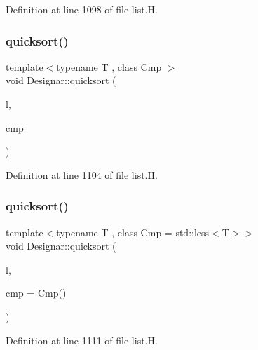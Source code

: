 Definition at line 1098 of file list.\+H.

\mbox{\label{namespace_designar_abdb3fae2c35a0696dfb66711eb224f5a}} 
\subsubsection{\texorpdfstring{quicksort()}{quicksort()}\hspace{0.1cm}{\footnotesize\ttfamily [8/14]}}
{\footnotesize\ttfamily template$<$typename T , class Cmp $>$ \\
void Designar\+::quicksort (\begin{DoxyParamCaption}\item[{\hyperlink{class_designar_1_1_d_l_list}{D\+L\+List}$<$ T $>$ \&}]{l,  }\item[{Cmp \&}]{cmp }\end{DoxyParamCaption})\hspace{0.3cm}{\ttfamily [inline]}}



Definition at line 1104 of file list.\+H.

\mbox{\label{namespace_designar_a199363a09da37dd34fdf7d151441fa44}} 
\subsubsection{\texorpdfstring{quicksort()}{quicksort()}\hspace{0.1cm}{\footnotesize\ttfamily [9/14]}}
{\footnotesize\ttfamily template$<$typename T , class Cmp  = std\+::less$<$\+T$>$$>$ \\
void Designar\+::quicksort (\begin{DoxyParamCaption}\item[{\hyperlink{class_designar_1_1_d_l_list}{D\+L\+List}$<$ T $>$ \&}]{l,  }\item[{Cmp \&\&}]{cmp = {\ttfamily Cmp()} }\end{DoxyParamCaption})\hspace{0.3cm}{\ttfamily [inline]}}



Definition at line 1111 of file list.\+H.

\mbox{\label{namespace_designar_af359499060a9d2b8e282ae9def049e17}} 
